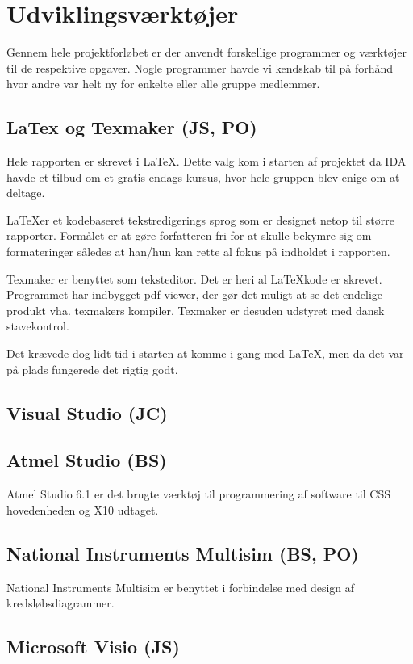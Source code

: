\chapter{Udviklingsværktøjer}
Gennem hele projektforløbet er der anvendt forskellige programmer og værktøjer til de respektive opgaver. Nogle programmer havde vi kendskab til på forhånd hvor andre var helt ny for enkelte eller alle gruppe medlemmer.

\section{LaTex og Texmaker (JS, PO)}
Hele rapporten er skrevet i \LaTeX. Dette valg kom i starten af projektet da IDA havde et tilbud om et gratis endags kursus, hvor hele gruppen blev enige om at deltage. 

\LaTeX er et kodebaseret tekstredigerings sprog som er designet netop til større rapporter. Formålet er at gøre forfatteren fri for at skulle bekymre sig om formateringer således at han/hun kan rette al fokus på indholdet i rapporten.

Texmaker er benyttet som teksteditor. Det er heri al \LaTeX kode er skrevet. Programmet har indbygget pdf-viewer, der gør det muligt at se det endelige produkt vha. texmakers kompiler. Texmaker er desuden udstyret med dansk stavekontrol.

Det krævede dog lidt tid i starten at komme i gang med \LaTeX, men da det var på plads fungerede det rigtig godt. 

\section{Visual Studio (JC)}

\section{Atmel Studio (BS)}
Atmel Studio 6.1 er det brugte værktøj til programmering af software til CSS hovedenheden og X10 udtaget.

\section{National Instruments Multisim (BS, PO)}
National Instruments Multisim er benyttet i forbindelse med design af kredsløbsdiagrammer. 

\section{Microsoft Visio (JS)} %


